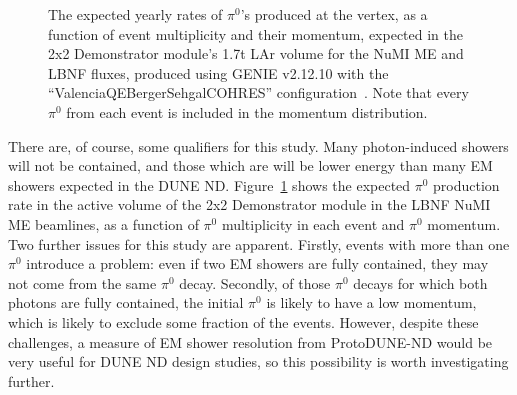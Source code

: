 \begin{figure}[htb]
  \centering
  \caption{The expected yearly rates of $\pi^{0}$'s produced at the vertex, as a function of event multiplicity and their momentum, expected in the 2x2 Demonstrator module's 1.7t LAr volume for the NuMI ME and LBNF fluxes, produced using GENIE v2.12.10 with the ``ValenciaQEBergerSehgalCOHRES'' configuration~\cite{genie}. Note that every $\pi^{0}$ from each event is included in the momentum distribution.}
  \label{fig:pi0_kinematics}
\end{figure}
There are, of course, some qualifiers for this study. Many photon-induced showers will not be contained, and those which are will be lower energy than many EM showers expected in the DUNE ND. Figure~\ref{fig:pi0_kinematics} shows the expected $\pi^{0}$ production rate in the active volume of the 2x2 Demonstrator module in the LBNF NuMI ME beamlines, as a function of $\pi^{0}$ multiplicity in each event and $\pi^{0}$ momentum. Two further issues for this study are apparent. Firstly, events with more than one $\pi^{0}$ introduce a problem: even if two EM showers are fully contained, they may not come from the same $\pi^{0}$ decay. Secondly, of those $\pi^{0}$ decays for which both photons are fully contained, the initial $\pi^{0}$ is likely to have a low momentum, which is likely to exclude some fraction of the events. However, despite these challenges, a measure of EM shower resolution from ProtoDUNE-ND would be very useful for DUNE ND design studies, so this possibility is worth investigating further.

